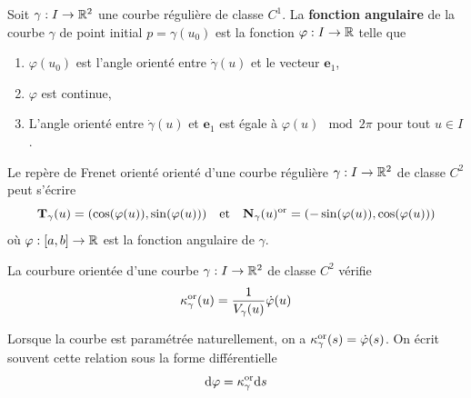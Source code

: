 \begin{definition}
	Soit $\gamma : I \to \mathbb{R}^2$ une courbe régulière de classe $C^1$. La \textbf{fonction angulaire} de la courbe $\gamma$ de point initial $p = \gamma(u_0)$ est la fonction	$\varphi : I \to \mathbb{R}$ telle que
	\begin{enumerate}
		\item $\varphi(u_0)$ est l'angle orienté entre $\dot \gamma(u)$ et le vecteur $\bm e_1$,
		\item $\varphi$ est continue,
		\item L'angle orienté entre $\dot \gamma(u)$ et $\bm e_1$ est égale à $\varphi(u) \mod{2\pi}$ pour tout $u \in I$.
	\end{enumerate}
\end{definition}

\begin{lemme} \label{lem: repère de Frenet exprimé via la fontion angulaire}
	Le repère de Frenet orienté orienté d'une courbe régulière $\gamma : I \to \mathbb{R}^2$ de classe $C^2$ peut s'écrire
	\[
	\mathbf{T}_\gamma(u) = (\cos(\varphi(u)), \sin(\varphi(u))) \quad \text{et} \quad \mathbf{N}_\gamma(u)^{\operatorname{or}} = (- \sin(\varphi(u)), \cos(\varphi(u)))
	\]
	où $\varphi : [a,b] \to \mathbb{R}$ est la fonction angulaire de $\gamma$.
\end{lemme}


\begin{theoreme}
	La courbure orientée d'une courbe $\gamma : I \to \mathbb{R}^2$ de classe $C^2$ vérifie
	\[
	\kappa_\gamma^{\operatorname{or}}(u) = \frac{1}{V_\gamma (u)} \dot \varphi (u)
	\]
\end{theoreme}


\begin{remarque}
	Lorsque la courbe est paramétrée naturellement, on a $\kappa_\gamma^{\operatorname{or}}(s) = \dot \varphi(s)$. On écrit souvent cette relation sous la forme différentielle
	\[
	\mathrm d \varphi = \kappa_\gamma^{\operatorname{or}} \mathrm ds
	\]
\end{remarque}

